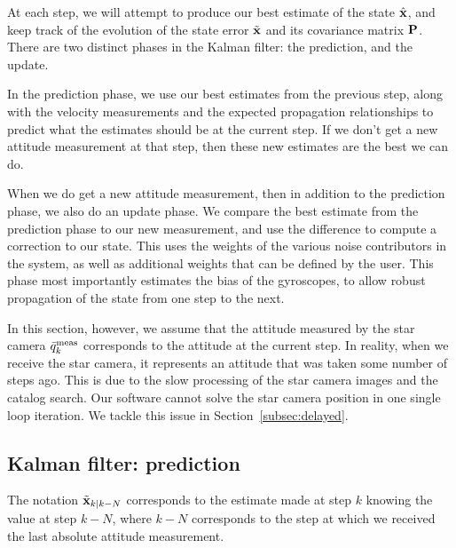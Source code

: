 At each step, we will attempt to produce our best estimate of the state $\hat{\textrm{\textbf{x}}}$, and keep track of the evolution of the state error $\tilde{\textrm{\textbf{x}}}$ and its covariance matrix $\textrm{\textbf{P}}$. There are two distinct phases in the Kalman filter: the prediction, and the update.

In the prediction phase, we use our best estimates from the previous step, along with the velocity measurements and the expected propagation relationships to predict what the estimates should be at the current step. If we don't get a new attitude measurement at that step, then these new estimates are the best we can do.

When we do get a new attitude measurement, then in addition to the prediction phase, we also do an update phase. We compare the best estimate from the prediction phase to our new measurement, and use the difference to compute a correction to our state. This uses the weights of the various noise contributors in the system, as well as additional weights that can be defined by the user. This phase most importantly estimates the bias of the gyroscopes, to allow robust propagation of the state from one step to the next.

In this section, however, we assume that the attitude measured by the star camera $\bar{q}^{\textrm{meas}}_k$ corresponds to the attitude at the current step. In reality, when we receive the star camera, it represents an attitude that was taken some number of steps ago. This is due to the slow processing of the star camera images and the catalog search. Our software cannot solve the star camera position in one single loop iteration. We tackle this issue in Section~\ref{subsec:delayed}. 

\subsection{Kalman filter: prediction}


The notation $\tilde{\textrm{\textbf{x}}}_{k|k-N}$ corresponds to the estimate made at step $k$ knowing the value at step $k-N$, where $k-N$ corresponds to the step at which we received the last absolute attitude measurement. 

